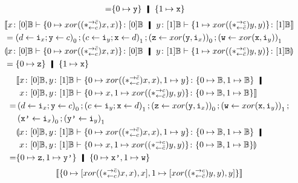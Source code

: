 {\begin{example}
\begin{align*}
   =& \{0\mapsto \p y\}\hmid \{1\mapsto \p x\}
  \end{align*}
\begin{align*}
 &\semo{\tj{x}{[0]\bool}\tr\tj{\{0\mapsto xor((\comodL)x,x)\}}{[0]\bool}\hmid
  \tj{y}{[1]\bool}\tr\tj{\{1\mapsto xor((\comodR)y,y)\}}{[1]\bool}}\\
&= \left(d\leftarrow \p i_x; \p y\leftarrow c\right)_0;
 \left(c\leftarrow \p i_y; \p x\leftarrow d\right)_1;
 \left(\p z\leftarrow xor(\p y,\p i_x)\right)_0;
 \left(\p w\leftarrow xor(\p x,\p i_y)\right)_1
 \\
 &\semoi{\tj{x}{[0]\bool}\tr\tj{\{0\mapsto xor((\comodL)x,x)\}}{[0]\bool}\hmid
  \tj{y}{[1]\bool}\tr\tj{\{1\mapsto xor((\comodR)y,y)\}}{[1]\bool}} \\
 &= \{0\mapsto \p z\} \hmid \{1\mapsto \p x\}
\end{align*}
  \begin{align*}
&\llbracket
 \tj{x}{[0]\bool}, \tj{y}{[1]\bool}\tr
 \tj{\{
  0\mapsto {xor((\comodL)x,x)}, 1\mapsto {y}
  \}}
  {\{0\mapsto \bool, 1\mapsto \bool\}}
  \hmid\phantom{\rrbracket}
   \\
&\phantom{\llbracket}
     \tj{x}{[0]\bool}, \tj{y}{[1]\bool}\tr
  \tj
  {\{
  0\mapsto {x},
  1\mapsto {xor((\comodR)y, y)}
  \}}
  {\{0\mapsto
  \bool
  , 1\mapsto
  \bool
  \}}\rrbracket\phantom{\hmid}\\
   =& \left(d\leftarrow \p i_x; \p y\leftarrow c\right)_0;
 \left(c\leftarrow \p i_y; \p x\leftarrow d\right)_1;
 \left(\p z\leftarrow xor(\p y,\p i_x)\right)_0;
 \left(\p w\leftarrow xor(\p x,\p i_y)\right)_1; \\
   & \left(\p{x'}\leftarrow \p i_x\right)_0;
     \left(\p{y'}\leftarrow \p i_y\right)_1 \\
&\llparenthesis
 \tj{x}{[0]\bool}, \tj{y}{[1]\bool}\tr
 \tj{\{
  0\mapsto {xor((\comodL)x,x)}, 1\mapsto {y}
  \}}
  {\{0\mapsto \bool, 1\mapsto \bool\}}
  \hmid\phantom{\rrparenthesis}
   \\
&\phantom{\llparenthesis}
     \tj{x}{[0]\bool}, \tj{y}{[1]\bool}\tr
  \tj
  {\{
  0\mapsto {x},
  1\mapsto {xor((\comodR)y, y)}
  \}}
  {\{0\mapsto
  \bool
  , 1\mapsto
  \bool
  \}}\rrparenthesis\phantom{\hmid}\\
   =&
   \{0\mapsto \p z, 1\mapsto \p{y'}\} \hmid \{0\mapsto\p{x'}, 1\mapsto
   \p w\}
  \end{align*}
  \begin{align*}
   &\semo{
   \{
   0\mapsto \cotuple{{xor((\comodL)x,x)},x},
   1\mapsto \cotuple{{xor((\comodR)y,y)},y}
   \}}
   \\

\end{align*}
\end{example}}
